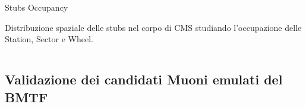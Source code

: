 \documentclass{beamer}
\begin{document}








\begin{frame}{Stubs Occupancy}

Distribuzione spaziale delle stubs nel corpo di CMS studiando l'occupazione delle Station, Sector e Wheel.

\vspace{0.8 cm}

\begin{columns}

    \begin{column}{0.5\textwidth}
    \end{column}
    \begin{column}{0.5\textwidth}
        \centering
    \end{column}
\end{columns}

\end{frame}


\subsection{Validazione dei candidati Muoni emulati del BMTF}
\end{document}
